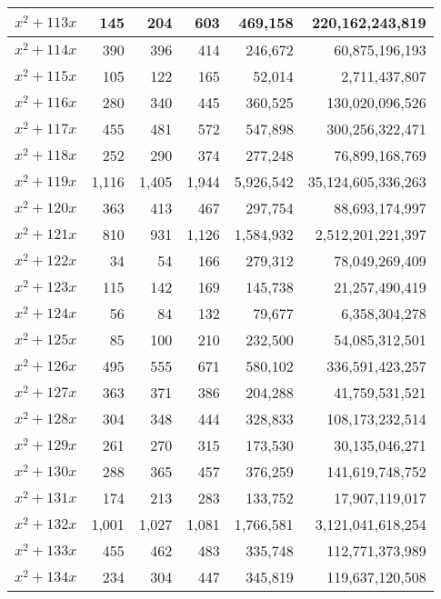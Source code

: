 \documentclass[a4paper]{amsproc}
\theoremstyle{plain}
\begin{document}
\begin{longtable}{ | l | r | r | r | r | r | }
$x^2 + 113x$ & 145 & 204 & 603 & 469{,}158 & 220{,}162{,}243{,}819 \\ \hline
$x^2 + 114x$ & 390 & 396 & 414 & 246{,}672 & 60{,}875{,}196{,}193 \\ \hline
$x^2 + 115x$ & 105 & 122 & 165 & 52{,}014 & 2{,}711{,}437{,}807 \\ \hline
$x^2 + 116x$ & 280 & 340 & 445 & 360{,}525 & 130{,}020{,}096{,}526 \\ \hline
$x^2 + 117x$ & 455 & 481 & 572 & 547{,}898 & 300{,}256{,}322{,}471 \\ \hline
$x^2 + 118x$ & 252 & 290 & 374 & 277{,}248 & 76{,}899{,}168{,}769 \\ \hline
$x^2 + 119x$ & 1{,}116 & 1{,}405 & 1{,}944 & 5{,}926{,}542 & 35{,}124{,}605{,}336{,}263 \\ \hline
$x^2 + 120x$ & 363 & 413 & 467 & 297{,}754 & 88{,}693{,}174{,}997 \\ \hline
$x^2 + 121x$ & 810 & 931 & 1{,}126 & 1{,}584{,}932 & 2{,}512{,}201{,}221{,}397 \\ \hline
$x^2 + 122x$ & 34 & 54 & 166 & 279{,}312 & 78{,}049{,}269{,}409 \\ \hline
$x^2 + 123x$ & 115 & 142 & 169 & 145{,}738 & 21{,}257{,}490{,}419 \\ \hline
$x^2 + 124x$ & 56 & 84 & 132 & 79{,}677 & 6{,}358{,}304{,}278 \\ \hline
$x^2 + 125x$ & 85 & 100 & 210 & 232{,}500 & 54{,}085{,}312{,}501 \\ \hline
$x^2 + 126x$ & 495 & 555 & 671 & 580{,}102 & 336{,}591{,}423{,}257 \\ \hline
$x^2 + 127x$ & 363 & 371 & 386 & 204{,}288 & 41{,}759{,}531{,}521 \\ \hline
$x^2 + 128x$ & 304 & 348 & 444 & 328{,}833 & 108{,}173{,}232{,}514 \\ \hline
$x^2 + 129x$ & 261 & 270 & 315 & 173{,}530 & 30{,}135{,}046{,}271 \\ \hline
$x^2 + 130x$ & 288 & 365 & 457 & 376{,}259 & 141{,}619{,}748{,}752 \\ \hline
$x^2 + 131x$ & 174 & 213 & 283 & 133{,}752 & 17{,}907{,}119{,}017 \\ \hline
$x^2 + 132x$ & 1{,}001 & 1{,}027 & 1{,}081 & 1{,}766{,}581 & 3{,}121{,}041{,}618{,}254 \\ \hline
$x^2 + 133x$ & 455 & 462 & 483 & 335{,}748 & 112{,}771{,}373{,}989 \\ \hline
$x^2 + 134x$ & 234 & 304 & 447 & 345{,}819 & 119{,}637{,}120{,}508 \\ \hline

\end{longtable}
\end{document}
